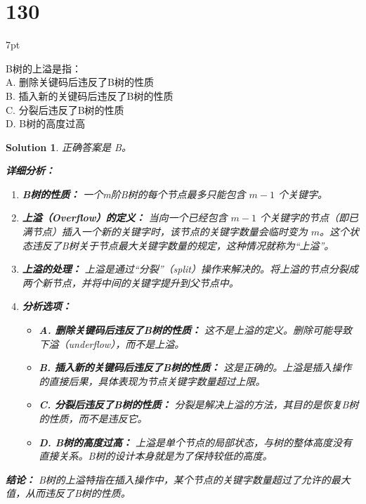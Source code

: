 \documentclass[UTF8]{report}
\newtheorem{solution}{Solution}
\theoremstyle{MyLineTheoremStyle} %
\theoremstyle{MyBlockTheoremStyle} %
\theoremstyle{MySubsubsectionStyle} %
\newenvironment{graybox}{%
        \def\FrameCommand{%
        \hspace{1pt}%
        {\color{gray}\small \vrule width 2pt}%
        {\color{graybox_color}\vrule width 4pt}%
        \colorbox{graybox_color}%
        }%
        \MakeFramed{\advance\hsize-\width\FrameRestore}%
        \noindent\hspace{-4.55pt}%
        \begin{adjustwidth}{}{7pt}%
        \vspace{2pt}\vspace{2pt}%
        }
        {%
        \vspace{2pt}\end{adjustwidth}\endMakeFramed%
        }
\begin{document}
\section*{130}
\begin{graybox}
B树的上溢是指：\\
A. 删除关键码后违反了B树的性质\\
B. 插入新的关键码后违反了B树的性质\\
C. 分裂后违反了B树的性质\\
D. B树的高度过高
\end{graybox}

\begin{solution}
正确答案是 B。

\textbf{详细分析：}

\begin{enumerate}
    \item \textbf{B树的性质：}
    一个m阶B树的每个节点最多只能包含 $m-1$ 个关键字。

    \item \textbf{上溢（Overflow）的定义：}
    当向一个已经包含 $m-1$ 个关键字的节点（即已满节点）插入一个新的关键字时，该节点的关键字数量会临时变为 $m$。这个状态违反了B树关于节点最大关键字数量的规定，这种情况就称为“上溢”。

    \item \textbf{上溢的处理：}
    上溢是通过“分裂”（split）操作来解决的。将上溢的节点分裂成两个新节点，并将中间的关键字提升到父节点中。

    \item \textbf{分析选项：}
    \begin{itemize}
        \item \textbf{A. 删除关键码后违反了B树的性质：}  这不是上溢的定义。删除可能导致下溢（underflow），而不是上溢。
        \item \textbf{B. 插入新的关键码后违反了B树的性质：}  这是正确的。上溢是插入操作的直接后果，具体表现为节点关键字数量超过上限。
        \item \textbf{C. 分裂后违反了B树的性质：} 分裂是解决上溢的方法，其目的是恢复B树的性质，而不是违反它。
        \item \textbf{D. B树的高度过高：} 上溢是单个节点的局部状态，与树的整体高度没有直接关系。B树的设计本身就是为了保持较低的高度。
    \end{itemize}
\end{enumerate}

\textbf{结论：}
B树的上溢特指在插入操作中，某个节点的关键字数量超过了允许的最大值，从而违反了B树的性质。
\end{solution}
\end{document}
